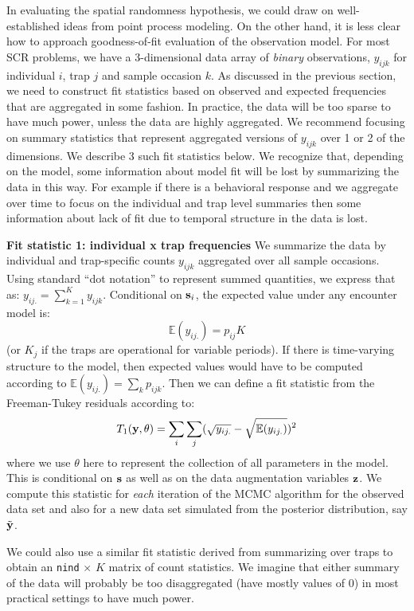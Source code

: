 In evaluating the spatial randomness hypothesis, we could draw on
well-established ideas from point process modeling. On the other hand, 
it is less clear how to approach goodness-of-fit evaluation of the
observation model.  For most SCR problems, we have a 3-dimensional
data array of {\it binary} observations, $y_{ijk}$ for individual $i$,
trap $j$ and sample occasion $k$. As  discussed
in the previous section, we need to construct fit statistics based on
observed and expected frequencies that are aggregated in some fashion.
In practice, the data will be too sparse to have much power, unless
the 
data are highly aggregated. We recommend focusing on summary
statistics that represent aggregated versions of $y_{ijk}$ over 1 or 2
of the dimensions. We describe 3 such fit statistics below.  We
recognize that, depending on the model, some information about model
fit will be lost by summarizing the data in this way. For example if
there is a behavioral response and we aggregate over time to focus on
the individual and trap level summaries then some information about
lack of fit due to temporal structure in the data is lost.

{\bf Fit statistic 1: individual x trap frequencies} We summarize the
data by individual and trap-specific counts $y_{ijk}$
aggregated over
all sample occasions. Using standard ``dot notation'' to represent
summed quantities, we express that as:
$y_{ij.} = \sum_{k=1}^{K} y_{ijk}$.
 Conditional on ${\bf s}_{i}$, the expected value
under any encounter model is:
\[
 \mathbb{E}(y_{ij.}) = p_{ij} K
\]
(or $K_{j}$ if the traps are operational for variable periods). If
there is time-varying structure to the model, then expected values
would have to be computed according to $\mathbb{E}(y_{ij.}) = \sum_{k} p_{ijk}$.
Then we can define a fit statistic from the Freeman-Tukey residuals
according to:
\[
 T_{1}({\bf y}, \theta) = \sum_{i}\sum_{j} (\sqrt{ y_{ij.} } - \sqrt{ \mathbb{E}(y_{ij.}) })^2
\]
where we use $\theta$ here to represent the collection of all
parameters in the model.  This is conditional on ${\bf s}$ as well as
on the data augmentation variables ${\bf z}$. We compute this
statistic for {\it each} iteration of the MCMC algorithm for the
observed data set and also for a new data set simulated from the posterior
distribution, say $\tilde{\bf y}$.

We could also use a similar fit statistic derived from summarizing
over traps to obtain an \mbox{\tt nind} $\times$ $K$ matrix of count
statistics.  We imagine that either summary of the data will probably
be too disaggregated (have mostly values of 0) in most practical settings to have much power.



